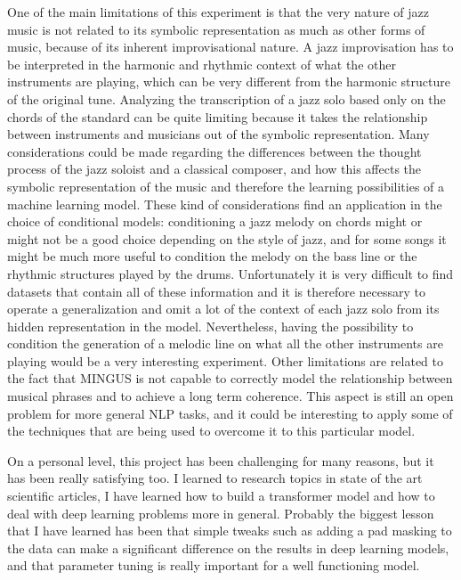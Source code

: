 \documentclass{article}
\begin{document}
One of the main limitations of this experiment is that the very nature of jazz music is not related to its symbolic representation as much as other forms of music, because of its inherent improvisational nature. A jazz improvisation has to be interpreted in the harmonic and rhythmic context of what the other instruments are playing, which can be very different from the harmonic structure of the original tune. Analyzing the transcription of a jazz solo based only on the chords of the standard can be quite limiting because it takes the relationship between instruments and musicians out of the symbolic representation. 
Many considerations could be made regarding the differences between the thought process of the jazz soloist and a classical composer, and how this affects the symbolic representation of the music and therefore the learning possibilities of a machine learning model. 
These kind of considerations find an application in the choice of conditional models: conditioning a jazz melody on chords might or might not be a good choice depending on the style of jazz, and for some songs it might be much more useful to condition the melody on the bass line or the rhythmic structures played by the drums. Unfortunately it is very difficult to find datasets that contain all of these information and it is therefore necessary to operate a generalization and omit a lot of the context of each jazz solo from its hidden representation in the model. Nevertheless, having the possibility to condition the generation of a melodic line on what all the other instruments are playing would be a very interesting experiment. 
Other limitations are related to the fact that MINGUS is not capable to correctly model the relationship between musical phrases and to achieve a long term coherence. This aspect is still an open problem for more general NLP tasks, and it could be interesting to apply some of the techniques that are being used to overcome it to this particular model.

On a personal level, this project has been challenging for many reasons, but it has been really satisfying too. I learned to research topics in state of the art scientific articles, I have learned how to build a transformer model and how to deal with deep learning problems more in general. Probably the biggest lesson that I have learned has been that simple tweaks such as adding a pad masking to the data can make a significant difference on the results in deep learning models, and that parameter tuning is really important for a well functioning model. 
\end{document}
